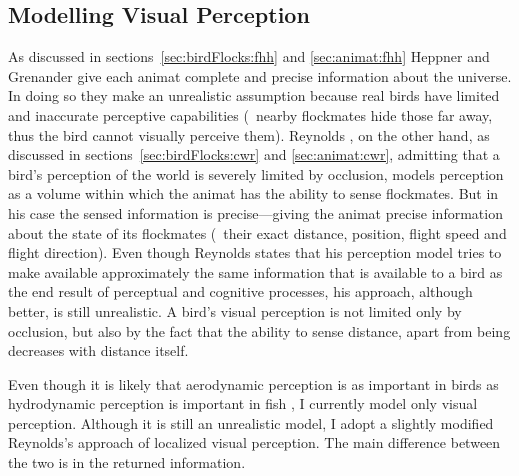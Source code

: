 \subsection{Modelling Visual Perception}
As discussed in sections~\ref{sec:birdFlocks:fhh} and \ref{sec:animat:fhh} Heppner and Grenander \cite{heppner:1990} give each animat complete and precise information about the universe. In doing so they make an unrealistic assumption because real birds have limited and inaccurate perceptive capabilities (\eg\ nearby flockmates hide those far away, thus the bird cannot visually perceive them). Reynolds \cite{reynolds:1987}, on the other hand, as discussed in sections~\ref{sec:birdFlocks:cwr} and \ref{sec:animat:cwr}, admitting that a bird's perception of the world is severely limited by occlusion, models perception as a volume within which the animat has the ability to sense flockmates. But in his case the sensed information is precise---giving the animat precise information about the state of its flockmates (\ie\ their exact distance, position, flight speed and flight direction). Even though Reynolds \cite{reynolds:1987} states that his perception model tries to make available approximately the same information that is available to a bird as the end result of perceptual and cognitive processes, his approach, although better, is still unrealistic. A bird's visual perception is not limited only by occlusion, but also by the fact that the ability to sense distance, apart from being  decreases with distance itself. 

Even though it is likely that aerodynamic perception is as important in birds as hydrodynamic perception is important in fish \cite{ward:2001}, I currently model only visual perception. Although it is still an unrealistic model, I adopt a slightly modified Reynolds's \cite{reynolds:1999} approach of localized visual perception. The main difference between the two is in the returned information. 

